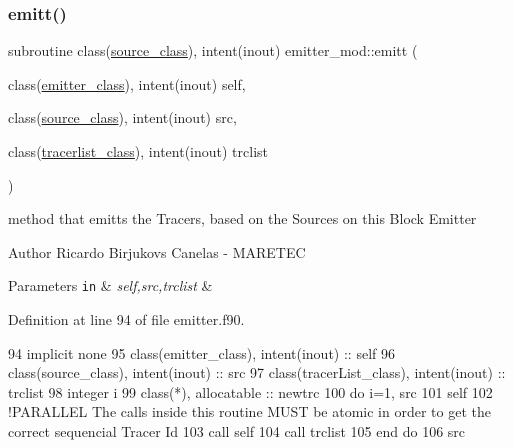 \subsubsection{\texorpdfstring{emitt()}{emitt()}}
{\footnotesize\ttfamily subroutine class(\mbox{\hyperlink{structsources__mod_1_1source__class}{source\+\_\+class}}), intent(inout) emitter\+\_\+mod\+::emitt (\begin{DoxyParamCaption}\item[{class(\mbox{\hyperlink{structemitter__mod_1_1emitter__class}{emitter\+\_\+class}}), intent(inout)}]{self,  }\item[{class(\mbox{\hyperlink{structsources__mod_1_1source__class}{source\+\_\+class}}), intent(inout)}]{src,  }\item[{class(\mbox{\hyperlink{structtracer__list__mod_1_1tracerlist__class}{tracerlist\+\_\+class}}), intent(inout)}]{trclist }\end{DoxyParamCaption})\hspace{0.3cm}{\ttfamily [private]}}



method that emitts the Tracers, based on the Sources on this Block Emitter 

\begin{DoxyAuthor}{Author}
Ricardo Birjukovs Canelas -\/ M\+A\+R\+E\+T\+EC 
\end{DoxyAuthor}

\begin{DoxyParams}[1]{Parameters}
\mbox{\tt in}  & {\em self,src,trclist} & \\
\hline
\end{DoxyParams}


Definition at line 94 of file emitter.\+f90.


\begin{DoxyCode}
94     \textcolor{keywordtype}{implicit none}
95     \textcolor{keywordtype}{class}(emitter\_class), \textcolor{keywordtype}{intent(inout)} :: self
96     \textcolor{keywordtype}{class}(source\_class), \textcolor{keywordtype}{intent(inout)}  :: src
97     \textcolor{keywordtype}{class}(tracerList\_class), \textcolor{keywordtype}{intent(inout)}   :: trclist
98     \textcolor{keywordtype}{integer} i
99     \textcolor{keywordtype}{class}(*), \textcolor{keywordtype}{allocatable} :: newtrc
100     \textcolor{keywordflow}{do} i=1, src%
101         self%
102         \textcolor{comment}{!PARALLEL The calls inside this routine MUST be atomic in order to get the correct sequencial
       Tracer Id}
103         \textcolor{keyword}{call }self%
104         \textcolor{keyword}{call }trclist%
105 \textcolor{keywordflow}{    end do}
106     src%
\end{DoxyCode}
\mbox{\label{namespaceemitter__mod_a6376ad0f8e1739b29caf672aa0750373}} 
